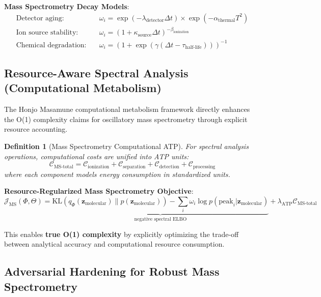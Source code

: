 \documentclass[11pt,a4paper]{article}
\newtheorem{definition}[theorem]{Definition}
\theoremstyle{remark}
\begin{document}
\textbf{Mass Spectrometry Decay Models}:
\begin{align}
\text{Detector aging:}\quad & \omega_i = \exp(-\lambda_{\text{detector}} \Delta t) \times \exp(-\alpha_{\text{thermal}} T^2)\\
\text{Ion source stability:}\quad & \omega_i = (1 + \kappa_{\text{source}} \Delta t)^{-\beta_{\text{ionization}}}\\
\text{Chemical degradation:}\quad & \omega_i = \left(1 + \exp(\gamma(\Delta t - \tau_{\text{half-life}}))\right)^{-1}
\end{align}

\subsection{Resource-Aware Spectral Analysis (Computational Metabolism)}

The Honjo Masamune computational metabolism framework directly enhances the O(1) complexity claims for oscillatory mass spectrometry through explicit resource accounting.

\begin{definition}[Mass Spectrometry Computational ATP]
For spectral analysis operations, computational costs are unified into ATP units:
\begin{equation}
\mathcal{C}_{\text{MS-total}} = \mathcal{C}_{\text{ionization}} + \mathcal{C}_{\text{separation}} + \mathcal{C}_{\text{detection}} + \mathcal{C}_{\text{processing}}
\end{equation}
where each component models energy consumption in standardized units.
\end{definition}

\textbf{Resource-Regularized Mass Spectrometry Objective}:
\begin{equation}
\mathcal{J}_{\text{MS}}(\Phi,\Theta) = \underbrace{\text{KL}(q_{\Phi}(\mathbf{z}_{\text{molecular}}) \| p(\mathbf{z}_{\text{molecular}})) - \sum_i \omega_i \log p(\text{peak}_i | \mathbf{z}_{\text{molecular}})}_{\text{negative spectral ELBO}} + \lambda_{\text{ATP}} \mathcal{C}_{\text{MS-total}}
\end{equation}

This enables \textbf{true O(1) complexity} by explicitly optimizing the trade-off between analytical accuracy and computational resource consumption.

\subsection{Adversarial Hardening for Robust Mass Spectrometry}
\end{document}

